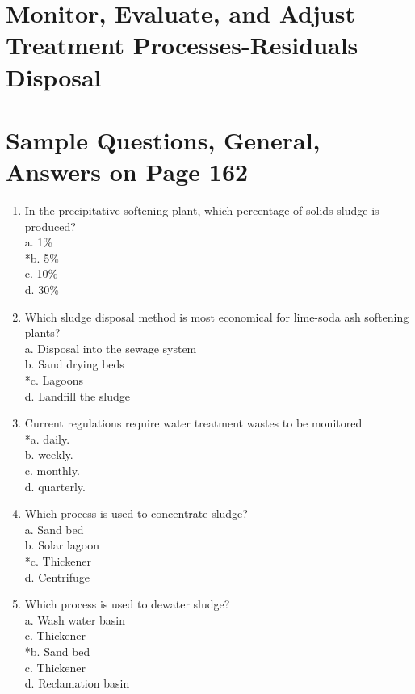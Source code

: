 \section{Monitor, Evaluate, and Adjust Treatment Processes-Residuals Disposal}
\section{Sample Questions, General, Answers on Page 162}
\begin{enumerate}[label=TG-\arabic*]
  \item In the precipitative softening plant, which percentage of solids sludge is produced?\\
a. 1\%\\
*b. 5\%\\
c. 10\%\\
d. 30\%\\
  \item Which sludge disposal method is most economical for lime-soda ash softening plants?\\
a. Disposal into the sewage system\\
b. Sand drying beds\\
*c. Lagoons\\
d. Landfill the sludge\\
  \item Current regulations require water treatment wastes to be monitored\\
*a. daily.\\
b. weekly.\\
c. monthly.\\
d. quarterly.\\
  \item Which process is used to concentrate sludge?\\
a. Sand bed\\
b. Solar lagoon\\
*c. Thickener\\
d. Centrifuge\\
  \item Which process is used to dewater sludge?\\
a. Wash water basin\\
c. Thickener\\
*b. Sand bed\\
c. Thickener\\
d. Reclamation basin\\
\end{enumerate}

